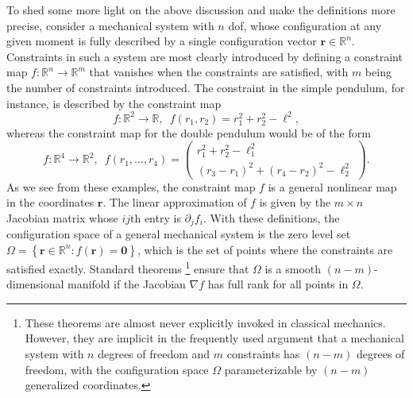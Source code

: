 To shed some more light on the above discussion and make the definitions more precise, consider a mechanical system with $n$ \ac{dof}, whose configuration at any given moment is fully described by a single configuration vector $\bm{r} \in \mathbb{R}^{n}$.
Constraints in such a system are most clearly introduced by defining a constraint map $f: \mathbb{R}^{n} \to \mathbb{R}^{m}$
that vanishes when the constraints are satisfied, with $m$ being the number of constraints introduced.
The constraint in the simple pendulum, for instance, is described by the constraint map
%
\begin{equation}
    f: \mathbb{R}^{2} \to \mathbb{R},\enspace f(r_{1}, r_{2}) = r_{1}^{2} + r_{2}^{2} - \ell^{2},
\end{equation}
%
whereas the constraint map for the double pendulum would be of the form
%
\begin{equation}
  f: \mathbb{R}^{4} \to \mathbb{R}^{2},\enspace f(r_{1}, \ldots, r_{4}) =
\begin{pmatrix}
 r_{1}^{2} + r_{2}^{2} - \ell_{1}^{2}\\
 (r_{3} - r_{1})^{2} + (r_{4} - r_{2})^{2} - \ell_{2}^{2}
\end{pmatrix}.
\end{equation}
%
As we see from these examples, the constraint map $f$ is a general nonlinear map in the coordinates $\bm{r}$.
The linear approximation of $f$ is given by the $m\times n$ Jacobian matrix whose $i\!j$th entry is $\partial_{j}f_{i}$.
With these definitions, the configuration space of a general mechanical system is the zero level set $\Omega = \left\{\bm{r} \in \mathbb{R}^{n} : f(\bm{r}) = \bm{0}\right\}$, which is the set of points where the constraints are satisfied exactly.
Standard theorems%
\footnote{These theorems are almost never explicitly invoked in classical mechanics.
However, they are implicit in the frequently used argument that a mechanical system with $n$ degrees of freedom and $m$ constraints has $(n-m)$ degrees of freedom, with the configuration space $\Omega$ parameterizable by $(n-m)$ generalized coordinates.}
ensure that $\Omega$ is a smooth $(n-m)$-dimensional manifold if the Jacobian $\nabla f$ has full rank for all points in $\Omega$.

